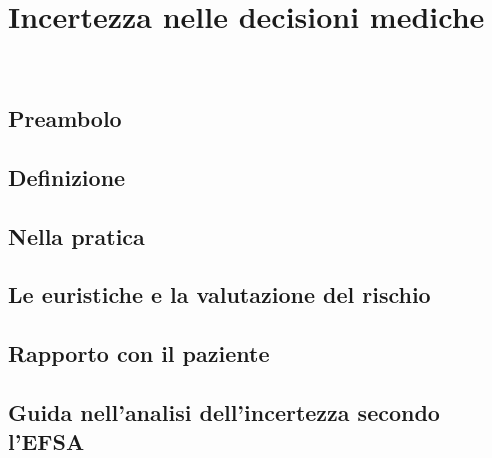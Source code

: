 \chapter{Incertezza nelle decisioni mediche}
\label{cap:incertezza-decisioni-mediche}

\\

\section{Preambolo}
\section{Definizione}
\section{Nella pratica}
\section{Le euristiche e la valutazione del rischio}
\section{Rapporto con il paziente}
\section{Guida nell'analisi dell'incertezza secondo l'EFSA}
